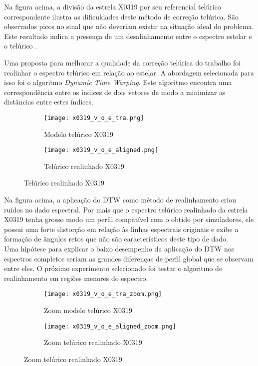 \documentclass[a1]{sciposter}
\begin{document}
\begin{multicols}{2}
Na figura acima, a divisão da estrela X0319 \cite{Chen2014TheXS} por seu referencial telúrico correspondente ilustra as dificuldades deste método de correção telúrica. São observados picos no sinal que não deveriam existir na situação ideal do problema. Este resultado indica a presença de um desalinhamento entre o espectro estelar e o telúrico \cite{unpublished-xshooter-data-release}.


Uma proposta para melhorar a qualidade da correção telúrica do trabalho foi realinhar o espectro telúrico em relação ao estelar. A abordagem selecionada para isso foi o algoritmo \textit{Dynamic Time Warping}. Este algoritmo encontra uma correspondência entre os índices de dois vetores de modo a minimizar as distâncias entre estes índices.

\begin{figure}
 \centering
 \begin{subfigure}{0.4\textwidth}
  \centering
  \texttt{[image: x0319\_v\_o\_e\_tra.png]}
  \caption{Modelo telúrico X0319}
 \end{subfigure}\hfil
 \begin{subfigure}{0.4\textwidth}
  \centering
  \texttt{[image: x0319\_v\_o\_e\_aligned.png]}
  \caption{Telúrico realinhado X0319}
 \end{subfigure}\hfil
\end{figure}

Na figura acima, a aplicação do DTW como método de realinhamento criou ruídos no dado espectral. Por mais que o espectro telúrico realinhado da estrela X0319 \cite{Chen2014TheXS} tenha grosso modo um perfil compatível com o obtido por simuladores, ele possui uma forte distorção em relação às linhas espectrais originais e exibe a formação de ângulos retos que não são característicos deste tipo de dado. \\

Uma hipótese para explicar o baixo desempenho da aplicação do DTW nos espectros completos seriam as grandes diferenças de perfil global que se observam entre eles. O próximo experimento selecionado foi testar o algoritmo de realinhamento em regiões menores do espectro.

\begin{figure}
 \centering
 \begin{subfigure}{0.4\textwidth}
  \centering
  \texttt{[image: x0319\_v\_o\_e\_tra\_zoom.png]}
  \caption{Zoom modelo telúrico X0319}
 \end{subfigure}\hfil
 \begin{subfigure}{0.4\textwidth}
  \centering
  \texttt{[image: x0319\_v\_o\_e\_aligned\_zoom.png]}
  \caption{Zoom telúrico realinhado X0319}
 \end{subfigure}\hfil
\end{figure}


\end{multicols}
\end{document}

